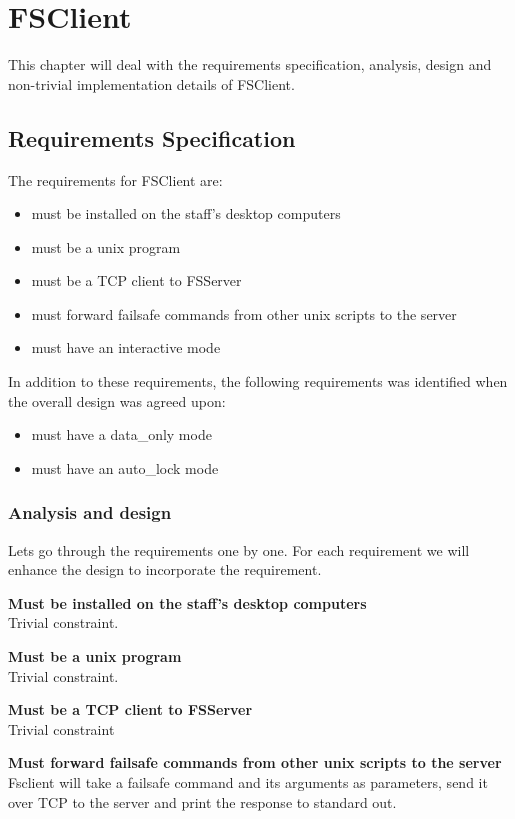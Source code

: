 \chapter{FSClient}
\label{chap:fsclient}

This chapter will deal with the requirements specification, analysis, design and non-trivial implementation details of FSClient.

\section{Requirements Specification}
The requirements for FSClient are:
\begin{itemize}
	\item must be installed on the staff's desktop computers
	\item must be a unix program
	\item must be a TCP client to FSServer
	\item must forward failsafe commands from other unix scripts to the server
	\item must have an interactive mode
\end{itemize}
In addition to these requirements, the following requirements was identified when the overall design was agreed upon:
\begin{itemize}
	\item must have a data\_only mode
	\item must have an auto\_lock mode
\end{itemize}

\subsection{Analysis and design}
Lets go through the requirements one by one. For each requirement we will enhance the design to incorporate the requirement.

\textbf{Must be installed on the staff's desktop computers} \\
Trivial constraint.

\textbf{Must be a unix program} \\
Trivial constraint.

\textbf{Must be a TCP client to FSServer} \\
Trivial constraint

\textbf{Must forward failsafe commands from other unix scripts to the server} \\
Fsclient will take a failsafe command and its arguments as parameters, send it over TCP to the server and print the response to standard out.

